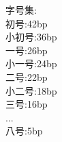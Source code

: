 \documentclass{ctexart}
\begin{document}
\begin{center}
	字号集:\\
	 初号:42bp\\
	 小初号:36bp\\
	 一号:26bp\\
	 小一号:24bp\\
	 二号:22bp\\
	小二号:18bp\\
	三号:16bp\\
	...\\
	八号:5bp
\end{center}
\end{document}
